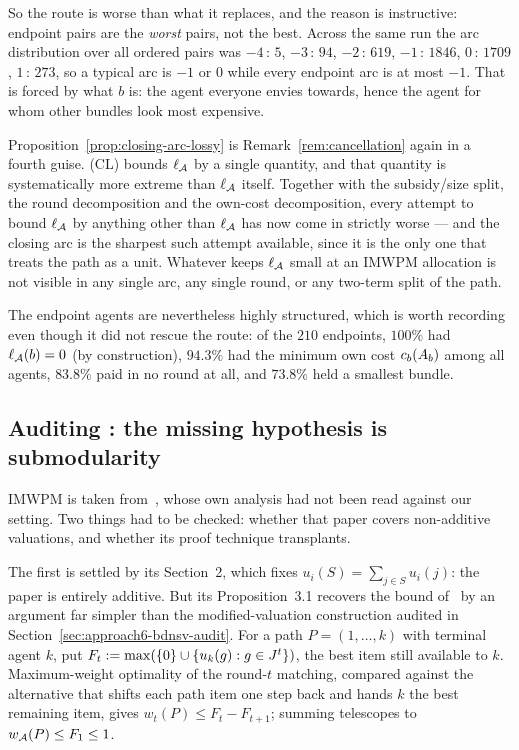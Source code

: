 So the route is worse than what it replaces, and the reason is instructive:
endpoint pairs are the \emph{worst} pairs, not the best. Across the same run the
arc distribution over all ordered pairs was $-4\,{:}\,5$, $-3\,{:}\,94$,
$-2\,{:}\,619$, $-1\,{:}\,1846$, $0\,{:}\,1709$, $1\,{:}\,273$, so a typical arc
is $-1$ or $0$ while every endpoint arc is at most $-1$. That is forced by what
$b$ is: the agent everyone envies towards, hence the agent for whom other bundles
look most expensive.

\begin{remark}
\label{rem:cancellation-four}
Proposition~\ref{prop:closing-arc-lossy} is Remark~\ref{rem:cancellation} again in
a fourth guise. (CL) bounds $\ell_{\mathcal{A}}$ by a single quantity, and that
quantity is systematically more extreme than $\ell_{\mathcal{A}}$ itself. Together
with the subsidy/size split, the round decomposition and the own-cost
decomposition, every attempt to bound $\ell_{\mathcal{A}}$ by anything other than
$\ell_{\mathcal{A}}$ has now come in strictly worse --- and the closing arc is the
sharpest such attempt available, since it is the only one that treats the path as
a unit. Whatever keeps $\ell_{\mathcal{A}}$ small at an IMWPM allocation is not
visible in any single arc, any single round, or any two-term split of the path.
\end{remark}

The endpoint agents are nevertheless highly structured, which is worth recording
even though it did not rescue the route: of the $210$ endpoints, $100\%$ had
$\ell_{\mathcal{A}}(b) = 0$ (by construction), $94.3\%$ had the minimum own cost
$c_b(A_{b})$ among all agents, $83.8\%$ paid in no round at all, and
$73.8\%$ held a smallest bundle.

\subsection{Auditing \texorpdfstring{\cite{LMS26}}{LMS26}: the missing hypothesis
is submodularity}
\label{sec:approach6-r11-audit}

IMWPM is taken from~\cite{LMS26}, whose own analysis had not been read against
our setting. Two things had to be checked: whether that paper covers non-additive
valuations, and whether its proof technique transplants.

The first is settled by its Section~2, which fixes $u_i(S) = \sum_{j \in S}
u_i(j)$: the paper is entirely additive. But its Proposition~3.1 recovers the
bound of~\cite{BDNSV20} by an argument far simpler than the modified-valuation
construction audited in Section~\ref{sec:approach6-bdnsv-audit}. For a path
$P = (1,\dots,k)$ with terminal agent $k$, put
$F_t := \max(\left\{0\right\} \cup \left\{u_k(g) : g \in J^t\right\})$, the best item still
available to $k$. Maximum-weight optimality of the round-$t$ matching, compared
against the alternative that shifts each path item one step back and hands $k$ the
best remaining item, gives $w_t(P) \le F_t - F_{t+1}$; summing telescopes to
$w_{\mathcal{A}}(P) \le F_1 \le 1$.

